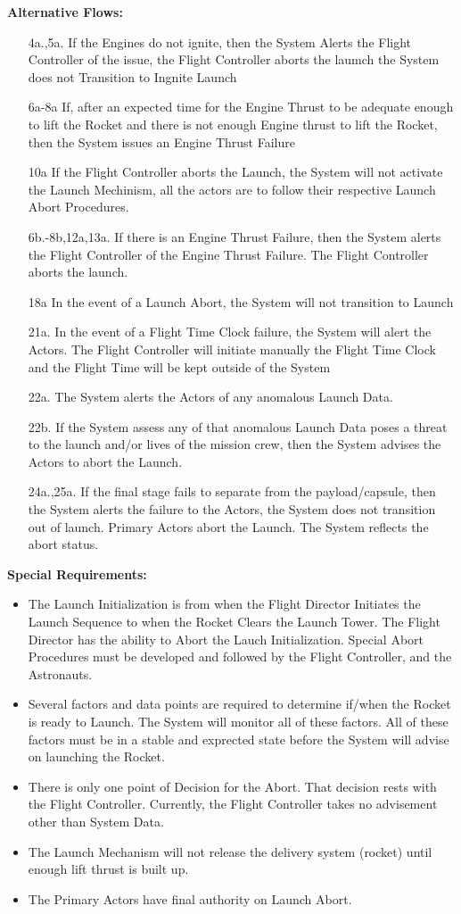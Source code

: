 \documentclass[letterpaper]{article}
\begin{document}
\textbf{Alternative Flows:}
\begin{itemize}
\item[4a.,5a.]If the Engines do not ignite, then the System Alerts the
Flight Controller of the issue, the Flight Controller aborts the
laumch the System does not Transition to Ingnite Launch
\item[6a-8a]If, after an expected time for the Engine Thrust to be
adequate enough to lift the Rocket and there is not enough Engine
thrust to lift the Rocket, then the System issues an Engine
Thrust Failure
\item[10a]If the Flight Controller aborts the Launch, the
System will not activate the Launch Mechinism, all the actors are to
follow their respective Launch Abort Procedures.
\item[6b.-8b,12a,13a.] If there is an Engine Thrust Failure, then the
System alerts the Flight Controller of the Engine Thrust Failure. The
Flight Controller aborts the launch.
\item[18a]In the event of a Launch Abort, the System will not
transition to Launch
\item[21a.] In the event of a Flight Time Clock failure, the System
will alert the Actors.  The Flight Controller will initiate manually the
Flight Time Clock and the Flight Time will be kept outside of the
System
\item[22a.]The System alerts the Actors of any anomalous Launch
Data.
\item[22b.]If the System assess any of that anomalous Launch Data poses a
threat to the launch and/or lives of the mission crew, then the System
advises the Actors to abort the Launch.
\item[24a.,25a.]If the final stage fails to separate from the
payload/capsule, then the System alerts the failure to the Actors, the
System does not transition out of launch.  Primary Actors abort the
Launch.  The System reflects the abort status.
\end{itemize}
\textbf{Special Requirements:}
\begin{itemize}
\item The Launch Initialization is from when the Flight Director
Initiates the Launch Sequence to when the Rocket Clears the Launch
Tower.  The Flight Director has the ability to Abort the Lauch
Initialization.  Special Abort Procedures must be developed and
followed by the Flight Controller, and the Astronauts.
\item Several factors and data points are required to determine
if/when the Rocket is ready to Launch.  The System will monitor all
of these factors.  All of these factors must be in a stable and
exprected state before the System will advise on launching the Rocket.
\item There is only one point of Decision for the Abort.  That decision
rests with the Flight Controller.  Currently, the Flight Controller
takes no advisement other than System Data.
\item The Launch Mechanism will not release the delivery system
(rocket) until enough lift thrust is built up.
\item The Primary Actors have final authority on Launch Abort.
\end{itemize}
\end{document}
